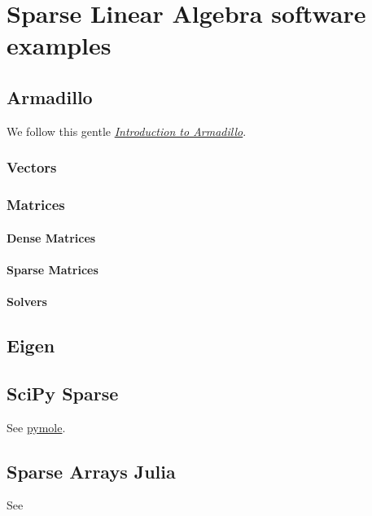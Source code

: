 \chapter{Sparse Linear Algebra software examples}

\section{Armadillo}

We follow this gentle
\href{https://anderkve.github.io/FYS3150/book/introduction_to_cpp/intro_to_armadillo.html}{\emph{Introduction to Armadillo}}.

\subsection{Vectors}

\subsection{Matrices}

\subsubsection{Dense Matrices}

\subsubsection{Sparse Matrices}

\subsubsection{Solvers}

\section{Eigen}

\section{SciPy Sparse}

See \href{https://github.com/nutrik/pymole}{pymole}.

\section{Sparse Arrays Julia}

See \href{https://robertsweeneyblanco.github.io/Programming_for_Mathematical_Applications/content/Sparse_Matrices/Sparse_Matrices_In_Julia.html}{}


